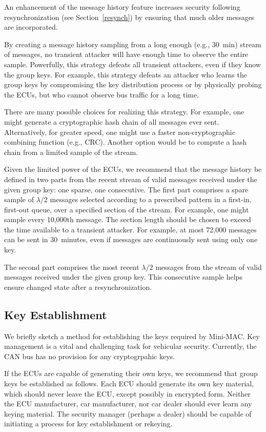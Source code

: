 An enhancement of the message history feature increases security following resynchronization
(see Section~\ref{resynch}) by ensuring that much older messages are incorporated.

By creating a message history sampling from a long enough (e.g., 30~min) stream of messages, 
no transient attacker will have enough time to observe the entire sample.
Powerfully, this strategy defeats all transient attackers, even if they know the group keys.
For example, this strategy defeats an attacker who learns the group keys by compromising
the key distribution process or by physically probing the ECUs, but who cannot
observe bus traffic for a long time.

There are many possible choices for realizing this strategy.  For example,
one might generate a cryptographic hash chain of all messages ever sent.  Alternatively, for
greater speed, one might use a faster non-cryptographic combining function (e.g., CRC).  
Another option would be to compute a hash chain from a limited sample of the stream.

Given the limited power of the ECUs, 
we recommend that the message history be defined in two parts from the recent stream of valid messages
received under the given group key: one sparse, one consecutive.  
The first part comprises a spare sample of $\lambda/2$ messages selected 
according to a prescribed pattern in a first-in, first-out queue, 
over a specified section of the stream.  
For example, one might sample every 10,000th message.  
The section length should be chosen to exceed the time available to a transient attacker.
For example, at most 72,000 messages can be sent in 30~minutes,
even if messages are continuously sent using only one key.

The second part comprises the most recent $\lambda/2$ 
messages from the stream of valid messages received under the given group key.
This consecutive sample helps ensure changed state after a resynchronization.

\subsection{Key Establishment}
\label{key}

We briefly sketch a method for establishing the keys required by Mini-MAC.  Key management
is a vital and challenging task for vehicular security.  Currently, the CAN bus has no
provision for any cryptogrpahic keys.

If the ECUs are capable of generating their own keys, 
we recommend that group keys be established as follows.  
Each ECU should generate its own key material,
which should never leave the ECU, except possibly in encrypted form.  Neither the ECU manufacturer, car manufacturer, 
nor car dealer should ever learn any keying material.  The security manager (perhaps a dealer) should be capable of initiating
a process for key establishment or rekeying.

